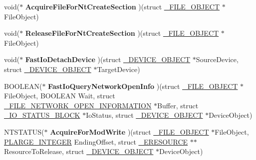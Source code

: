 \begin{DoxyCompactItemize}
\item 
\hypertarget{struct__FAST__IO__DISPATCH_ac3afae8089355d9a7d281837579f35f8}{}void($\ast$ {\bfseries Acquire\+File\+For\+Nt\+Create\+Section} )(struct \hyperlink{struct__FILE__OBJECT}{\+\_\+\+F\+I\+L\+E\+\_\+\+O\+B\+J\+E\+C\+T} $\ast$File\+Object)\label{struct__FAST__IO__DISPATCH_ac3afae8089355d9a7d281837579f35f8}

\item 
\hypertarget{struct__FAST__IO__DISPATCH_a530f1e8c0b39d5a71e2f0bd2e2a1419e}{}void($\ast$ {\bfseries Release\+File\+For\+Nt\+Create\+Section} )(struct \hyperlink{struct__FILE__OBJECT}{\+\_\+\+F\+I\+L\+E\+\_\+\+O\+B\+J\+E\+C\+T} $\ast$File\+Object)\label{struct__FAST__IO__DISPATCH_a530f1e8c0b39d5a71e2f0bd2e2a1419e}

\item 
\hypertarget{struct__FAST__IO__DISPATCH_a8fb75efd0c24aab3301009bc2caf9326}{}void($\ast$ {\bfseries Fast\+Io\+Detach\+Device} )(struct \hyperlink{struct__DEVICE__OBJECT}{\+\_\+\+D\+E\+V\+I\+C\+E\+\_\+\+O\+B\+J\+E\+C\+T} $\ast$Source\+Device, struct \hyperlink{struct__DEVICE__OBJECT}{\+\_\+\+D\+E\+V\+I\+C\+E\+\_\+\+O\+B\+J\+E\+C\+T} $\ast$Target\+Device)\label{struct__FAST__IO__DISPATCH_a8fb75efd0c24aab3301009bc2caf9326}

\item 
\hypertarget{struct__FAST__IO__DISPATCH_a73c2669ff5bd6a6679586e1c522fe613}{}B\+O\+O\+L\+E\+A\+N($\ast$ {\bfseries Fast\+Io\+Query\+Network\+Open\+Info} )(struct \hyperlink{struct__FILE__OBJECT}{\+\_\+\+F\+I\+L\+E\+\_\+\+O\+B\+J\+E\+C\+T} $\ast$File\+Object, B\+O\+O\+L\+E\+A\+N Wait, struct \hyperlink{struct__FILE__NETWORK__OPEN__INFORMATION}{\+\_\+\+F\+I\+L\+E\+\_\+\+N\+E\+T\+W\+O\+R\+K\+\_\+\+O\+P\+E\+N\+\_\+\+I\+N\+F\+O\+R\+M\+A\+T\+I\+O\+N} $\ast$Buffer, struct \hyperlink{struct__IO__STATUS__BLOCK}{\+\_\+\+I\+O\+\_\+\+S\+T\+A\+T\+U\+S\+\_\+\+B\+L\+O\+C\+K} $\ast$Io\+Status, struct \hyperlink{struct__DEVICE__OBJECT}{\+\_\+\+D\+E\+V\+I\+C\+E\+\_\+\+O\+B\+J\+E\+C\+T} $\ast$Device\+Object)\label{struct__FAST__IO__DISPATCH_a73c2669ff5bd6a6679586e1c522fe613}

\item 
\hypertarget{struct__FAST__IO__DISPATCH_afd1cbe418ca299a35f6d34fd309b9892}{}N\+T\+S\+T\+A\+T\+U\+S($\ast$ {\bfseries Acquire\+For\+Mod\+Write} )(struct \hyperlink{struct__FILE__OBJECT}{\+\_\+\+F\+I\+L\+E\+\_\+\+O\+B\+J\+E\+C\+T} $\ast$File\+Object, \hyperlink{union__LARGE__INTEGER}{P\+L\+A\+R\+G\+E\+\_\+\+I\+N\+T\+E\+G\+E\+R} Ending\+Offset, struct \hyperlink{struct__ERESOURCE}{\+\_\+\+E\+R\+E\+S\+O\+U\+R\+C\+E} $\ast$$\ast$Resource\+To\+Release, struct \hyperlink{struct__DEVICE__OBJECT}{\+\_\+\+D\+E\+V\+I\+C\+E\+\_\+\+O\+B\+J\+E\+C\+T} $\ast$Device\+Object)\label{struct__FAST__IO__DISPATCH_afd1cbe418ca299a35f6d34fd309b9892}


\end{DoxyCompactItemize}

